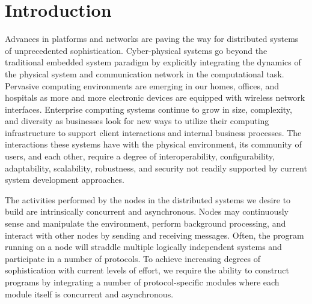 \section{Introduction}

Advances in platforms and networks are paving the way for distributed systems of unprecedented sophistication.
Cyber-physical systems go beyond the traditional embedded system paradigm by explicitly integrating the dynamics of the physical system and communication network in the computational task.
Pervasive computing environments are emerging in our homes, offices, and hospitals as more and more electronic devices are equipped with wireless network interfaces.
Enterprise computing systems continue to grow in size, complexity, and diversity as businesses look for new ways to utilize their computing infrastructure to support client interactions and internal business processes.
The interactions these systems have with the physical environment, its community of users, and each other, require a degree of interoperability, configurability, adaptability, scalability, robustness, and security not readily supported by current system development approaches.

The activities performed by the nodes in the distributed systems we desire to build are intrinsically concurrent and asynchronous.
Nodes may continuously sense and manipulate the environment, perform background processing, and interact with other nodes by sending and receiving messages.
Often, the program running on a node will straddle multiple logically independent systems and participate in a number of protocols.
To achieve increasing degrees of sophistication with current levels of effort, we require the ability to construct programs by integrating a number of protocol-specific modules where each module itself is concurrent and asynchronous.




